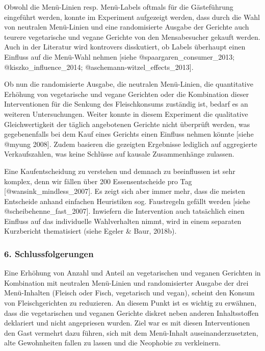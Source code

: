 \documentclass[12pt,ngerman,]{article}
\begin{document}
\par

Obwohl die Menü-Linien resp. Menü-Labels oftmals für die Gästeführung
eingeführt werden, konnte im Experiment aufgezeigt werden, dass durch
die Wahl von neutralen Menü-Linien und eine randomisierte Ausgabe der
Gerichte auch teurere vegetarische und vegane Gerichte von den
Mensabesucher gekauft werden. Auch in der Literatur wird kontrovers
disskutiert, ob Labels überhaupt einen Einfluss auf die Menü-Wahl nehmen
{[}siehe @spaargaren\_consumer\_2013; @kiszko\_influence\_2014;
@aschemann-witzel\_effects\_2013{]}.

\par

Ob nun die randomisierte Ausgabe, die neutralen Menü-Linien, die
quantitative Erhöhung von vegetarische und vegane Gerichten oder die
Kombination dieser Interventionen für die Senkung des Fleischkonsums
zuständig ist, bedarf es an weiteren Untersuchungen. Weiter konnte in
diesem Experiment die qualitative Gleichwertigkeit der täglich
angebotenen Gerichte nicht überprüft werden, was gegebenenfalls bei dem
Kauf eines Gerichts einen Einfluss nehmen könnte {[}siehe @myung
2008{]}. Zudem basieren die gezeigten Ergebnisse lediglich auf
aggregierte Verkaufszahlen, was keine Schlüsse auf kausale Zusammenhänge
zulassen.

\par

Eine Kaufentscheidung zu verstehen und demnach zu beeinflussen ist sehr
komplex, denn wir fällen über 200 Essensentscheide pro Tag
{[}@wansink\_mindless\_2007{]}. Es zeigt sich aber immer mehr, dass die
meisten Entscheide anhand einfachen Heuristiken sog. Faustregeln gefällt
werden {[}siehe @scheibehenne\_fast\_2007{]}. Inwiefern die Intervention
auch tatsächlich einen Einfluss auf das individuelle Wahlverhalten
nimmt, wird in einem separaten Kurzbericht thematisiert (siehe Egeler \&
Baur, 2018b).

\hypertarget{schlussfolgerungen}{%
\subsubsection{6. Schlussfolgerungen}\label{schlussfolgerungen}}

Eine Erhöhung von Anzahl und Anteil an vegetarischen und veganen
Gerichten in Kombination mit neutralen Menü-Linien und randomisierter
Ausgabe der drei Menü-Inhalten (Fleisch oder Fisch, vegetarisch und
vegan), scheint den Konsum von Fleischgerichten zu reduzieren. An diesem
Punkt ist es wichtig zu erwähnen, dass die vegetarischen und veganen
Gerichte diskret neben anderen Inhaltsstoffen deklariert und nicht
angepriesen wurden. Ziel war es mit diesen Interventionen den Gast
vermehrt dazu führen, sich mit dem Menü-Inhalt auseinanderzusetzten,
alte Gewohnheiten fallen zu lassen und die Neophobie zu verkleinern.
\end{document}

